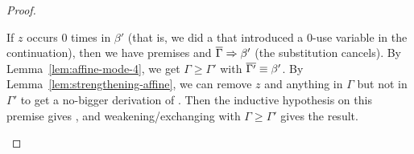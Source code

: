 \begin{proof}
\begin{itemize}
  If $z$ occurs 0 times in $\beta'$ (that is, we did a \UL\/ that
  introduced a 0-use variable in the continuation), then we have
  premises  and $\overline{\Gamma} \Rightarrow
  \beta'$ (the substitution cancels).  By Lemma~\ref{lem:affine-mode-4},
  we get $\Gamma \ge \Gamma'$ with $\overline{\Gamma'} \equiv \beta'$.  By
  Lemma~\ref{lem:strengthening-affine}, we can remove $z$ and anything
  in $\Gamma$ but not in $\Gamma'$ to get a no-bigger derivation of
  .  Then the inductive hypothesis on
  this premise gives , and weakening/exchanging with
  $\Gamma \ge \Gamma'$ gives the result.
\end{itemize}

\end{proof}




